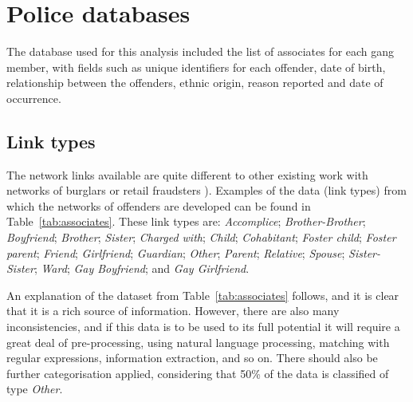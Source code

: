 \documentclass[twocolumn]{svjour3}          %
\theoremstyle{definition}
\begin{document}
\section{Police databases}\label{sec:policedatabases}

The database used for this analysis included the list of associates
for each gang member, with fields such as unique identifiers for each
offender, date of birth, relationship between the offenders, ethnic
origin, reason reported and date of occurrence.

\subsection{Link types}\label{sec:linktypes} 

The network links available are quite different to other existing work
with networks of burglars or retail fraudsters
\citep{OatleyZeleznikowLearyEwart2005,OatleyMcGarryEwart2006}). Examples
of the data (link types) from which the networks of offenders are
developed can be found in Table~\ref{tab:associates}. These link types
are: \emph{Accomplice}; \emph{Brother-Brother}; \emph{Boyfriend};
\emph{Brother}; \emph{Sister}; \emph{Charged with}; \emph{Child};
\emph{Cohabitant}; \emph{Foster child}; \emph{Foster parent};
\emph{Friend}; \emph{Girlfriend}; \emph{Guardian}; \emph{Other};
\emph{Parent}; \emph{Relative}; \emph{Spouse}; \emph{Sister-Sister};
\emph{Ward}; \emph{Gay Boyfriend}; and \emph{Gay Girlfriend}.

An explanation of the dataset from Table~\ref{tab:associates} follows,
and it is clear that it is a rich source of information. However,
there are also many inconsistencies, and if this data is to be used to
its full potential it will require a great deal of pre-processing,
using natural language processing, matching with regular expressions,
information extraction, and so on. There should also be further
categorisation applied, considering that 50\% of the data is
classified of type \emph{Other}.
\end{document}
